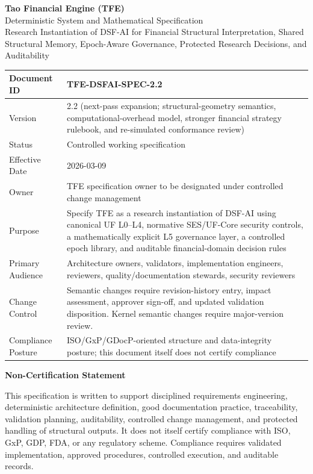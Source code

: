 \documentclass[11pt]{report}
\begin{document}
\begin{titlepage}
\centering
{\Huge \textbf{Tao Financial Engine (TFE)}}\\[0.35cm]
{\LARGE Deterministic System and Mathematical Specification}\\[0.25cm]
{\Large Research Instantiation of DSF-AI for Financial Structural Interpretation, Shared Structural Memory, Epoch-Aware Governance, Protected Research Decisions, and Auditability}\\[0.9cm]

\renewcommand{\arraystretch}{1.18}
\begin{tabularx}{\textwidth}{|p{}|Y|}
\hline
Document ID & TFE-DSFAI-SPEC-2.2 \\\hline
Version & 2.2 (next-pass expansion; structural-geometry semantics, computational-overhead model, stronger financial strategy rulebook, and re-simulated conformance review) \\\hline
Status & Controlled working specification \\\hline
Effective Date & 2026-03-09 \\\hline
Owner & TFE specification owner to be designated under controlled change management \\\hline
Purpose & Specify TFE as a research instantiation of DSF-AI using canonical UF L0--L4, normative SES/UF-Core security controls, a mathematically explicit L5 governance layer, a controlled epoch library, and auditable financial-domain decision rules \\\hline
Primary Audience & Architecture owners, validators, implementation engineers, reviewers, quality/documentation stewards, security reviewers \\\hline
Change Control & Semantic changes require revision-history entry, impact assessment, approver sign-off, and updated validation disposition. Kernel semantic changes require major-version review. \\\hline
Compliance Posture & ISO/GxP/GDocP-oriented structure and data-integrity posture; this document itself does not certify compliance \\\hline
\end{tabularx}

\vfill
{\large \textbf{Non-Certification Statement}}\\[0.2cm]
\parbox{0.93\textwidth}{This specification is written to support disciplined requirements engineering, deterministic architecture definition, good documentation practice, traceability, validation planning, auditability, controlled change management, and protected handling of structural outputs. It does not itself certify compliance with ISO, GxP, GDP, FDA, or any regulatory scheme. Compliance requires validated implementation, approved procedures, controlled execution, and auditable records.}
\vfill
\end{titlepage}
\end{document}
